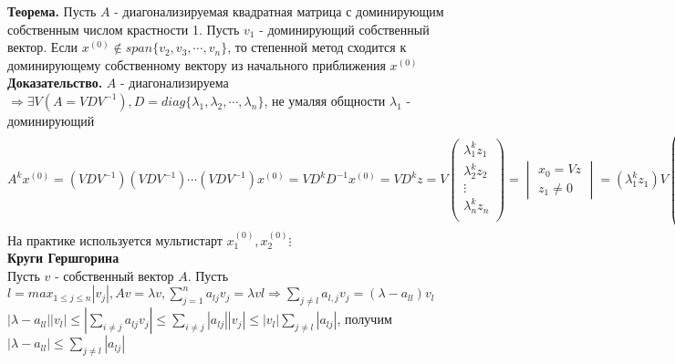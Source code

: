     \textbf{Теорема.} Пусть \(A\) - диагонализируемая квадратная матрица с доминирующим собственным числом крастности 1. Пусть \(v_1\) - доминирующий собственный вектор. Если \(x^{(0)} \notin span\{v_2,v_3,\cdots,v_n\}\), то степенной метод сходится к доминирующему собственному вектору из начального приближения \(x^{(0)}\) \\

    \textbf{Доказательство.} \(A\) - диагонализируема \(\Rightarrow \exists V(A = VDV^{-1}), D = diag \{\lambda_1, \lambda_2, \cdots, \lambda_n\}\), не умаляя общности \(\lambda_1\) - доминирующий \\

    \(A^kx^{(0)} = (VDV^{-1})(VDV^{-1})\cdots(VDV^{-1})x^{(0)} = VD^kD^{-1}x^{(0)} = VD^kz 
    = V \begin{pmatrix} 
    \lambda_1^kz_1 \\ 
    \lambda_2^kz_2 \\
    \vdots \\
    \lambda_n^kz_n \\
    \end{pmatrix} = 
    \begin{vmatrix}
        x_0 = Vz \\z_1 \neq 0
    \end{vmatrix} = (\lambda_1^kz_1)V\begin{pmatrix}
        1 \\
        (\frac{\lambda_2}{\lambda_1})^k * z_2/z_1 \\
        \vdots \\
        (\frac{\lambda_n}{\lambda_1})^k * z_n/z_1 \\
    \end{pmatrix} \Rightarrow (\lambda_1^kz_1)V  \begin{pmatrix} 1 \\ 0 \\ \vdots \\ 0 \end{pmatrix} = Cv_1
    \)
    \\

    На практике используется мультистарт \(x_1^{(0)}, x_2^{(0)} \vdots\) \\

    \textbf{Круги Гершгорина} \\
    Пусть \(v\) - собственный вектор \(A\). Пусть \(l = max_{1 \leq j \leq n}|v_j|, Av = \lambda v, \sum^n_{j=1} a_{lj}v_{j}=\lambda v l \Rightarrow \sum_{j\neq l} a_{l,j}v_{j} = (\lambda - a_{ll})v_l\) \\
    \(|\lambda - a_{ll}||v_l| \leq |\sum_{i \neq j} a_{lj}v_j| \leq \sum_{i \neq j} |a_{lj}||v_j| \leq |v_l|\sum_{j\neq l}|a_{lj}|\), получим \(|\lambda - a_{ll}| \leq \sum_{j \neq l} |a_{lj}|\) \\

